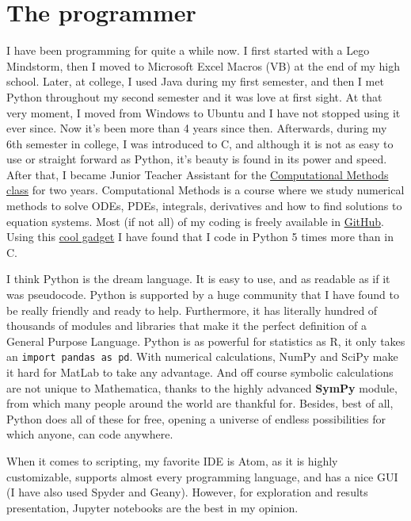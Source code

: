\documentclass[12pt]{article}
\newcommand{\sympy}{\textbf{SymPy}}
\begin{document}
\section{The programmer}
I have been programming for quite a while now. I first started with a Lego Mindstorm, then I moved to Microsoft Excel Macros (VB) at the end of my high school. Later, at college, I used Java during my first semester, and then I met Python throughout my second semester and it was love at first sight. At that very moment, I moved from Windows to Ubuntu and I have not stopped using it ever since. Now it's been more than 4 years since then. Afterwards, during my 6th semester in college, I was introduced to C, and although it is not as easy to use or straight forward as Python, it's beauty is found in its power and speed. After that, I became Junior Teacher Assistant for the \href{https://github.com/ComputoCienciasUniandes/MetodosComputacionales}{Computational Methods class} for two years. Computational Methods is a course where we study numerical methods to solve ODEs, PDEs, integrals, derivatives and how to find solutions to equation systems. Most (if not all) of my coding is freely available in \href{http://www.github.com/jsbarbosa}{GitHub}. Using this \href{http://ionicabizau.github.io/github-profile-languages/?user=\%2540jsbarbosa}{cool gadget} I have found that I code in Python 5 times more than in C.

I think Python is the dream language. It is easy to use, and as readable as if it was pseudocode. Python is supported by a huge community that I have found to be really friendly and ready to help. Furthermore, it has literally hundred of thousands of modules and libraries that make it the perfect definition of a General Purpose Language. Python is as powerful for statistics as R, it only takes an \texttt{import pandas as pd}. With numerical calculations, NumPy and SciPy make it hard for MatLab to take any advantage. And off course symbolic calculations are not unique to Mathematica, thanks to the highly advanced \sympy{} module, from which many people around the world are thankful for. Besides, best of all, Python does all of these for free, opening a universe of endless possibilities for which anyone, can code anywhere.

When it comes to scripting, my favorite IDE is Atom, as it is highly customizable, supports almost every programming language, and has a nice GUI (I have also used Spyder and Geany). However, for exploration and results presentation, Jupyter notebooks are the best in my opinion.
\end{document}
